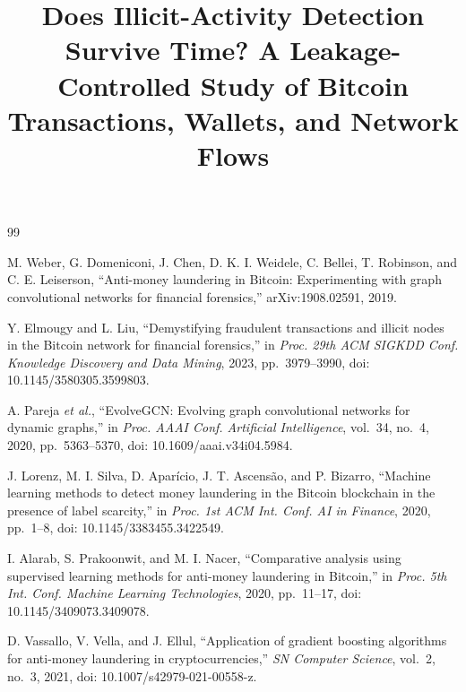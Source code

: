 \documentclass[conference]{IEEEtran}
\begin{document}
\title{Does Illicit-Activity Detection Survive Time? A Leakage-Controlled Study of Bitcoin Transactions, Wallets, and Network Flows}

\author{
}

\maketitle










\begin{thebibliography}{99}

 M. Weber, G. Domeniconi, J. Chen, D. K. I. Weidele, C. Bellei, T. Robinson, and C. E. Leiserson, ``Anti-money laundering in Bitcoin: Experimenting with graph convolutional networks for financial forensics,'' arXiv:1908.02591, 2019.

 Y. Elmougy and L. Liu, ``Demystifying fraudulent transactions and illicit nodes in the Bitcoin network for financial forensics,'' in \emph{Proc. 29th ACM SIGKDD Conf. Knowledge Discovery and Data Mining}, 2023, pp.~3979--3990, doi: 10.1145/3580305.3599803.

 A. Pareja \emph{et al.}, ``EvolveGCN: Evolving graph convolutional networks for dynamic graphs,'' in \emph{Proc. AAAI Conf. Artificial Intelligence}, vol.~34, no.~4, 2020, pp.~5363--5370, doi: 10.1609/aaai.v34i04.5984.

 J. Lorenz, M. I. Silva, D. Apar\'icio, J. T. Ascens\~ao, and P. Bizarro, ``Machine learning methods to detect money laundering in the Bitcoin blockchain in the presence of label scarcity,'' in \emph{Proc. 1st ACM Int. Conf. AI in Finance}, 2020, pp.~1--8, doi: 10.1145/3383455.3422549.

 I. Alarab, S. Prakoonwit, and M. I. Nacer, ``Comparative analysis using supervised learning methods for anti-money laundering in Bitcoin,'' in \emph{Proc. 5th Int. Conf. Machine Learning Technologies}, 2020, pp.~11--17, doi: 10.1145/3409073.3409078.

 D. Vassallo, V. Vella, and J. Ellul, ``Application of gradient boosting algorithms for anti-money laundering in cryptocurrencies,'' \emph{SN Computer Science}, vol.~2, no.~3, 2021, doi: 10.1007/s42979-021-00558-z.


\end{thebibliography}
\end{document}
